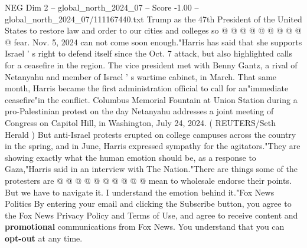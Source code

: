 \begin{textsample}{NEG Dim 2 – global\_north\_2024\_07 – Score -1.00 – global\_north\_2024\_07/111167440.txt}
Trump as the 47th President of the United States to restore law and order to our cities and colleges so @ @ @ @ @ @ @ @ @ @ fear.
Nov. 5, 2024 can not come soon enough."Harris has said that she supports Israel ' s right to defend itself since the Oct. 7 attack, but also highlighted calls for a ceasefire in the region.
The vice president met with Benny Gantz, a rival of Netanyahu and member of Israel ' s wartime cabinet, in March.
That same month, Harris became the first administration official to call for an"immediate ceasefire"in the conflict.
Columbus Memorial Fountain at Union Station during a pro-Palestinian protest on the day Netanyahu addresses a joint meeting of Congress on Capitol Hill, in Washington, July 24, 2024. ( REUTERS/Seth Herald ) But anti-Israel protests erupted on college campuses across the country in the spring, and in June, Harris expressed sympathy for the agitators."They are showing exactly what the human emotion should be, as a response to Gaza,"Harris said in an interview with The Nation."There are things some of the protesters are @ @ @ @ @ @ @ @ @ @ mean to wholesale endorse their points.
But we have to navigate it.
I understand the emotion behind it."Fox News Politics By entering your email and clicking the Subscribe button, you agree to the Fox News Privacy Policy and Terms of Use, and agree to receive content and \textbf{promotional} communications from Fox News.
You understand that you can \textbf{opt-out} at any time.

\end{textsample}
